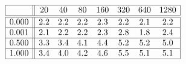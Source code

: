 \[
\begin{array}{|c||ccccccc|}
\hline 
& 20 & 40 & 80 & 160 & 320 & 640 & 1280\\
\hline \hline 
0.000 & 2.2 & 2.2 & 2.2 & 2.3 & 2.2 & 2.1 & 2.2 \\ \hline 
0.001 & 2.1 & 2.2 & 2.2 & 2.3 & 2.8 & 1.8 & 2.4 \\ \hline 
0.500 & 3.3 & 3.4 & 4.1 & 4.4 & 5.2 & 5.2 & 5.0 \\ \hline 
1.000 & 3.4 & 4.0 & 4.2 & 4.6 & 5.5 & 5.1 & 5.1 \\ \hline 
\end{array}
\]

